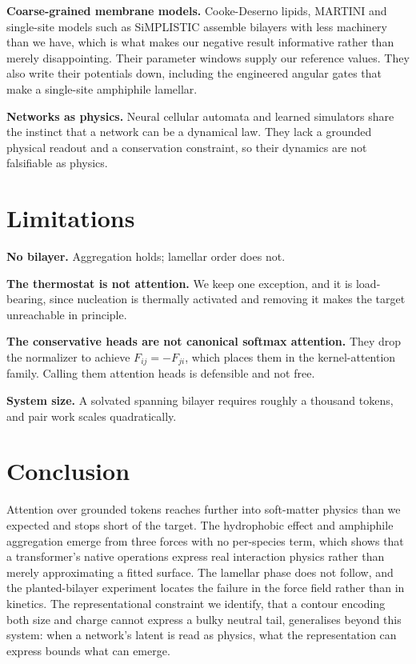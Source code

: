 \documentclass[10pt,twocolumn]{article}
\begin{document}
\textbf{Coarse-grained membrane models.} Cooke-Deserno lipids, MARTINI and single-site models such as
SiMPLISTIC assemble bilayers with less machinery than we have, which is what makes our negative result
informative rather than merely disappointing. Their parameter windows supply our reference values.
They also write their potentials down, including the engineered angular gates that make a single-site
amphiphile lamellar.

\textbf{Networks as physics.} Neural cellular automata and learned simulators share the instinct that
a network can be a dynamical law. They lack a grounded physical readout and a conservation
constraint, so their dynamics are not falsifiable as physics.

\section{Limitations}
\label{sec:limits}

\textbf{No bilayer.} Aggregation holds; lamellar order does not.

\textbf{The thermostat is not attention.} We keep one exception, and it is load-bearing, since
nucleation is thermally activated and removing it makes the target unreachable in principle.

\textbf{The conservative heads are not canonical softmax attention.} They drop the normalizer to
achieve $F_{ij} = -F_{ji}$, which places them in the kernel-attention family. Calling them attention
heads is defensible and not free.

\textbf{System size.} A solvated spanning bilayer requires roughly a thousand tokens, and pair work
scales quadratically.

\section{Conclusion}

Attention over grounded tokens reaches further into soft-matter physics than we expected and stops
short of the target. The hydrophobic effect and amphiphile aggregation emerge from three forces with
no per-species term, which shows that a transformer's native operations express real interaction
physics rather than merely approximating a fitted surface. The lamellar phase does not follow, and
the planted-bilayer experiment locates the failure in the force field rather than in kinetics. The
representational constraint we identify, that a contour encoding both size and charge cannot express
a bulky neutral tail, generalises beyond this system: when a network's latent is read as physics, what
the representation can express bounds what can emerge.

\balance
\end{document}
